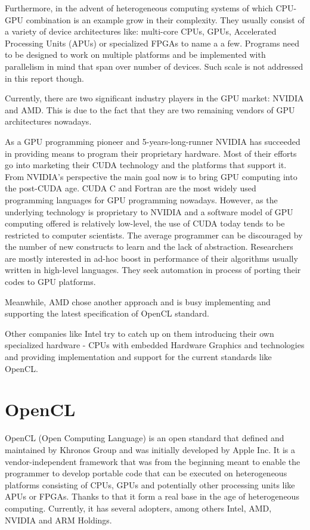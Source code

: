 Furthermore, in the advent of heterogeneous computing systems of which CPU-GPU combination is an example grow in their complexity. They usually consist of a variety of device architectures like: multi-core CPUs, GPUs, Accelerated Processing Units (APUs) or specialized FPGAs to name a a few. Programs need to be designed to work on multiple platforms and be implemented with parallelism in mind that span over number of devices. Such scale is not addressed in this report though.

Currently, there are two significant industry players in the GPU market: NVIDIA and AMD. This is due to the fact that they are two remaining vendors of GPU architectures nowadays. 

As a GPU programming pioneer and 5-years-long-runner NVIDIA has succeeded in providing means to program their proprietary hardware. Most of their efforts go into marketing their CUDA technology and the platforms that support it. From NVIDIA's perspective the main goal now is to bring GPU computing into the post-CUDA age. CUDA C and Fortran are the most widely used programming languages for GPU programming nowadays. However, as the underlying technology is proprietary to NVIDIA and a software model of GPU computing offered is relatively low-level, the use of CUDA today tends to be restricted to computer scientists. The average programmer can be discouraged by the number of new constructs to learn and the lack of abstraction. Researchers are mostly interested in ad-hoc boost in performance of their algorithms usually written in high-level languages. They seek automation in process of porting their codes to GPU platforms.

Meanwhile, AMD chose another approach and is busy implementing and supporting the latest specification of OpenCL standard.

Other companies like Intel try to catch up on them introducing their own specialized hardware - CPUs with embedded Hardware Graphics and technologies and providing implementation and support for the current standards like OpenCL.

\section{OpenCL}
OpenCL (Open Computing Language) is an open standard that defined and maintained by Khronos Group and was initially developed by Apple Inc. It is a vendor-independent framework that was from the beginning meant to enable the programmer to develop portable code that can be executed on heterogeneous platforms consisting of CPUs, GPUs and potentially other processing units like APUs or FPGAs. Thanks to that it form a real base in the age of heterogeneous computing. Currently, it has several adopters, among others Intel, AMD, NVIDIA and ARM Holdings.\cite{khronos2012adopt}

